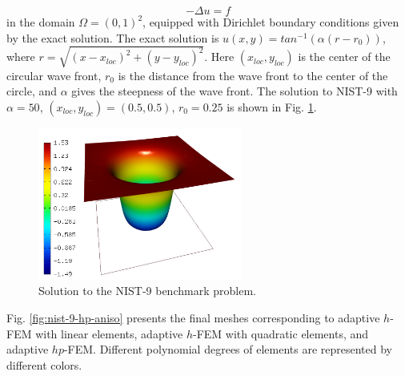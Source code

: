 \documentclass[12pt]{elsarticle}
\begin{document}
\begin{equation} \label{wave-front}
-\Delta u = f
\end{equation}
in the domain $\Omega = (0, 1)^2$, equipped with Dirichlet boundary conditions
given by the exact solution. The exact solution is
$u(x, y) = tan^{-1}(\alpha (r - r_{0}))$,
where $r = \sqrt{(x - x_{loc})^{2} + (y - y_{loc})^{2}}$.
Here $(x_{loc}, y_{loc})$ is the center of the circular wave front,
$r_{0}$ is the distance from the wave front to the center of the circle,
and $\alpha$ gives the steepness of the wave front.
The solution to NIST-9 with $\alpha = 50$, $(x_{loc}, y_{loc}) = (0.5, 0.5)$,
$r_{0} = 0.25$ is shown in Fig. \ref{fig:sln-nist09}.

\begin{figure}[H]
\centering
\vspace{-3mm}
\includegraphics[height=5cm]{nist/nist-9/solution.png}
\vspace{-3mm}
\caption{Solution to the NIST-9 benchmark problem.}
\vspace{-3mm}
\label{fig:sln-nist09}
\end{figure}

Fig. \ref{fig:nist-9-hp-aniso} presents the final meshes corresponding to adaptive $h$-FEM with 
linear elements, adaptive $h$-FEM with quadratic elements, and adaptive $hp$-FEM. Different 
polynomial degrees of elements are represented by different colors. 
\end{document}
